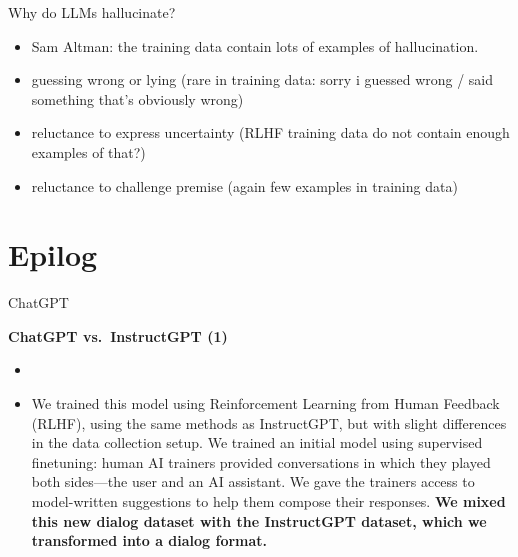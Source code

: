 \begin{vbframe}{Why do LLMs hallucinate?}

\vfill


	\begin{itemize}


\item Sam Altman: the training data contain lots of examples
of hallucination.
       
\item guessing wrong or lying (rare in training data: sorry
i guessed wrong / said something that's obviously wrong)

\item reluctance to express uncertainty (RLHF training data
do not contain enough examples of that?)

\item reluctance to challenge premise (again few examples in
training data)


\end{itemize}

\vfill

\end{vbframe}





\section{Epilog}






\begin{vbframe}{ChatGPT}

\vfill

\textbf{ChatGPT vs.\ InstructGPT (1)}

	\begin{itemize}
		\item \href{https://openai.com/blog/chatgpt}{}
		\item
                We trained this model using Reinforcement
		Learning from Human Feedback (RLHF), using
		the same methods as InstructGPT, but with
		slight differences in the data collection
		setup. We trained an initial model using
		supervised finetuning: human AI trainers
		provided conversations in which they played
		both sides—the user and an AI assistant. We
		gave the trainers access to model-written
		suggestions to help them compose their
		responses. \textbf{We mixed this new dialog
		dataset with the InstructGPT dataset, which
		we transformed into a dialog format.}
	\end{itemize}

\vfill

\end{vbframe}

